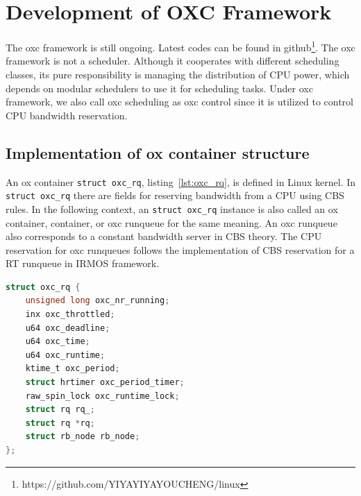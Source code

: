 \chapter{Development of OXC Framework\label{chap:impl}}
The oxc framework is still ongoing. Latest codes can be found 
in github\footnote{https://github.com/YIYAYIYAYOUCHENG/linux}.
The oxc framework is not a scheduler. Although it cooperates with
different scheduling classes, its pure responsibility is managing 
the distribution of CPU power, which depends on modular schedulers 
to use it for scheduling tasks. Under oxc framework, we also call
oxc scheduling as oxc control since it is utilized to control CPU 
bandwidth reservation.

\section{Implementation of ox container structure}
An ox container \texttt{struct oxc\_rq}, listing~\ref{lst:oxc_rq}, 
is defined in Linux kernel. In \texttt{struct oxc\_rq} there 
are fields for reserving bandwidth from a CPU using CBS rules. 
In the following context, an \texttt{struct oxc\_rq} instance is 
also called an ox container, container, or oxc runqueue for the 
same meaning. An oxc runqueue also corresponds to a constant 
bandwidth server in CBS theory. 
The CPU reservation for oxc runqueues follows the implementation 
of CBS reservation for a RT runqueue in IRMOS framework. 

\begin{lstlisting}[language=C, caption={\texttt{struct oxc\_rq}},
                        label={lst:oxc_rq}]
struct oxc_rq {
	unsigned long oxc_nr_running;
	inx oxc_throttled;
	u64 oxc_deadline;
	u64 oxc_time;
	u64 oxc_runtime;
	ktime_t oxc_period;
	struct hrtimer oxc_period_timer;
	raw_spin_lock oxc_runtime_lock;
	struct rq rq_;
	struct rq *rq;
	struct rb_node rb_node;
};
\end{lstlisting}

